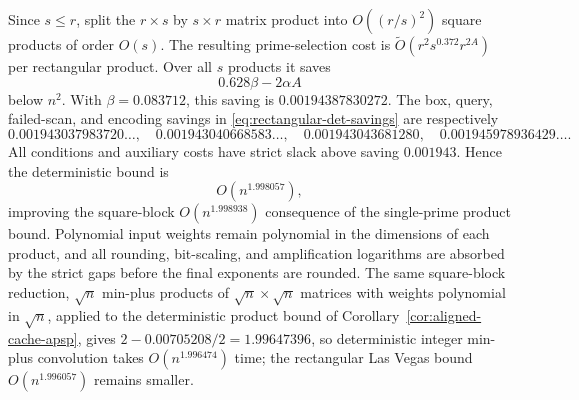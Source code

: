 \documentclass[11pt]{article}
\newcommand{\softO}{\widetilde O}
\begin{document}
Since $s\le r$, split the $r\times s$ by $s\times r$ matrix product
into $O((r/s)^2)$ square products of order $O(s)$. The resulting
prime-selection cost is $\softO(r^2s^{0.372}r^{2A})$ per rectangular
product. Over all $s$ products it saves
\[
 0.628\beta-2\alpha A
\]
below $n^2$. With $\beta=0.083712$, this saving is $0.00194387830272$.
The box, query, failed-scan, and encoding savings in \eqref{eq:rectangular-det-savings} are respectively
\[
 0.001943037983720\ldots,\quad
 0.001943040668583\ldots,\quad
 0.001943043681280,\quad
 0.001945978936429\ldots.
\]
All conditions and auxiliary costs have strict slack above saving
$0.001943$. Hence the deterministic bound is
\[
 \boxed{O(n^{1.998057})},
\]
improving the square-block $O(n^{1.998938})$ consequence of the single-prime
product bound. Polynomial input
weights remain polynomial in the dimensions of each product, and all
rounding, bit-scaling, and amplification logarithms are absorbed by the
strict gaps before the final exponents are rounded. The same square-block
reduction, $\sqrt n$ min-plus products of $\sqrt n\times\sqrt n$ matrices
with weights polynomial in $\sqrt n$, applied to the deterministic product
bound of Corollary~\ref{cor:aligned-cache-apsp}, gives
$2-0.00705208/2=1.99647396$, so deterministic integer min-plus convolution
takes $O(n^{1.996474})$ time; the rectangular Las Vegas bound
$O(n^{1.996057})$ remains smaller.
\end{document}
